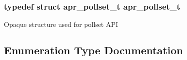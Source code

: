 \subsubsection[{\texorpdfstring{apr\+\_\+pollset\+\_\+t}{apr_pollset_t}}]{\setlength{\rightskip}{0pt plus 5cm}typedef struct {\bf apr\+\_\+pollset\+\_\+t} {\bf apr\+\_\+pollset\+\_\+t}}\hypertarget{group__apr__poll_ga680da1f10ac5ef75efc503a9d15b8906}{}\label{group__apr__poll_ga680da1f10ac5ef75efc503a9d15b8906}
Opaque structure used for pollset A\+PI 

\subsection{Enumeration Type Documentation}
